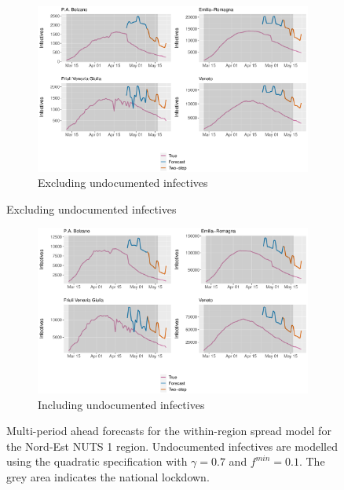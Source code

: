 \documentclass[12pt]{article}
\begin{document}
\begin{appendices}
		\begin{figure}[H]
    	    \centering
    	    \begin{subfigure}{\textwidth}
    	      \centering
    	      \includegraphics[width=0.91\linewidth]{output/model_within_lag14_forecast_full_Nord-Est.pdf}
    	      \caption{Excluding undocumented infectives}
    	      \label{fig:forecast_full_within_nordest_regular}
    	    \end{subfigure}
        \end{figure}
        \begin{figure}[H]\ContinuedFloat
    	    \begin{subfigure}{\textwidth}
    	      \centering
    	      \includegraphics[width=0.91\linewidth]{output/model_within_lag14_forecast_full_Nord-Est_UndocQuadratic.pdf}
    	      \caption{Including undocumented infectives}
    	      \label{fig:forecast_full_within_nordest_undoc}
    	    \end{subfigure}
    	    \caption{Multi-period ahead forecasts for the within-region spread model for the Nord-Est NUTS 1 region. Undocumented infectives are modelled using the quadratic specification with $\gamma = 0.7$ and $f^{min}=0.1$. The grey area indicates the national lockdown.}
    	    \label{fig:forecast_full_within_nordest}
        \end{figure}
        

\end{appendices}
\end{document}
